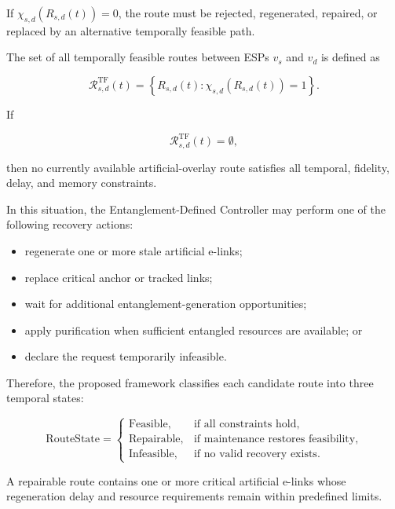 If $\chi_{s,d}\left(R_{s,d}(t)\right)=0$, the route must be rejected, regenerated, repaired, or replaced by an alternative temporally feasible path.

The set of all temporally feasible routes between ESPs $v_s$ and $v_d$ is defined as

\begin{equation}
    \mathcal{R}_{s,d}^{\mathrm{TF}}(t)
    =
    \left\{
    R_{s,d}(t)
    :
    \chi_{s,d}
    \left(
    R_{s,d}(t)
    \right)
    =
    1
    \right\}.
\end{equation}

If

\begin{equation}
    \mathcal{R}_{s,d}^{\mathrm{TF}}(t)
    =
    \emptyset,
\end{equation}

then no currently available artificial-overlay route satisfies all temporal, fidelity, delay, and memory constraints.

In this situation, the Entanglement-Defined Controller may perform one of the following recovery actions:

\begin{itemize}
    \item regenerate one or more stale artificial e-links;
    \item replace critical anchor or tracked links;
    \item wait for additional entanglement-generation opportunities;
    \item apply purification when sufficient entangled resources are available; or
    \item declare the request temporarily infeasible.
\end{itemize}

Therefore, the proposed framework classifies each candidate route into three temporal states:

\begin{equation}
\mathrm{RouteState}
=
\begin{cases}
\mathrm{Feasible},
& \text{if all constraints hold},\\
\mathrm{Repairable},
& \text{if maintenance restores feasibility},\\
\mathrm{Infeasible},
& \text{if no valid recovery exists}.
\end{cases}
\end{equation}

A repairable route contains one or more critical artificial e-links whose regeneration delay and resource requirements remain within predefined limits.


